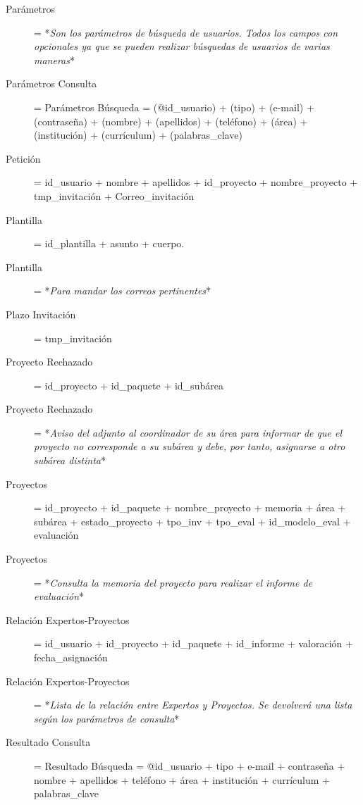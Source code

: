 \documentclass[12pt,a4paper,spanish,twoside]{book}
\begin{document}
\begin{description}
\item[Parámetros] = *\emph{Son los parámetros de búsqueda de usuarios. Todos
    los campos con opcionales ya que se pueden realizar búsquedas de usuarios
    de varias maneras}* 

\item[Parámetros Consulta] = Parámetros Búsqueda = (@id\_usuario) + (tipo) +
  (e-mail) + (contraseña) + (nombre) + (apellidos) + (teléfono) + (área) +
  (institución) + (currículum) + (palabras\_clave) 

\item[Petición] = id\_usuario + nombre + apellidos + id\_proyecto +
  nombre\_proyecto + tmp\_invitación + Correo\_invitación 

\item[Plantilla] = id\_plantilla + asunto + cuerpo.

\item[Plantilla] = *\emph{Para mandar los correos pertinentes}*

\item[Plazo Invitación] = tmp\_invitación

\item[Proyecto Rechazado] = id\_proyecto + id\_paquete + id\_subárea

\item[Proyecto Rechazado] = *\emph{Aviso del adjunto al coordinador de su
    área para informar de que el proyecto no corresponde a su subárea y debe,
    por tanto, asignarse a otro subárea distinta}* 

\item[Proyectos] = id\_proyecto + id\_paquete + nombre\_proyecto + memoria +
  área + subárea + estado\_proyecto + tpo\_inv + tpo\_eval + id\_modelo\_eval
  + evaluación 

\item[Proyectos] = *\emph{Consulta la memoria del proyecto para realizar el
    informe de evaluación}* 

\item[Relación Expertos-Proyectos] = {id\_usuario + id\_proyecto +
    id\_paquete + id\_informe + valoración + fecha\_asignación} 

\item[Relación Expertos-Proyectos] = *\emph{Lista de la relación entre
    Expertos y Proyectos. Se devolverá una lista según los parámetros de
    consulta}* 

\item[Resultado Consulta] = Resultado Búsqueda = {@id\_usuario + tipo +
    e-mail + contraseña + nombre + apellidos + teléfono + área + institución
    + currículum + {palabras\_clave}} 


\end{description}
\end{document}

